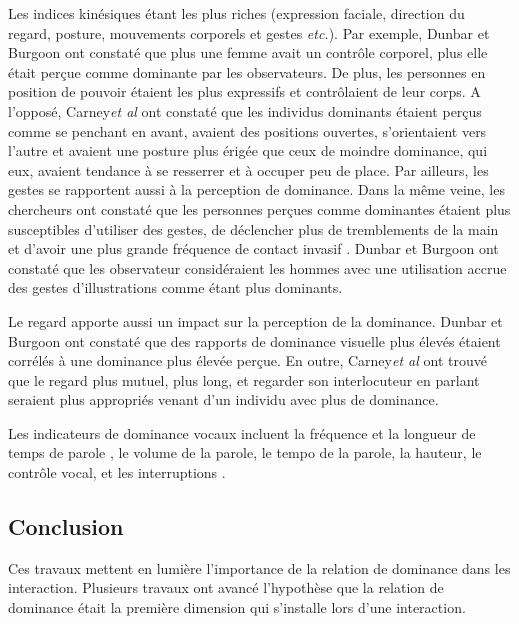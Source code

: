 			 Les indices kinésiques étant les plus riches (expression faciale, direction du regard, posture, mouvements corporels et gestes \emph{etc.}).
			Par exemple, Dunbar et Burgoon \cite{dunbar2005perceptions} ont constaté que plus une femme avait un contrôle corporel, plus elle était perçue comme dominante par les observateurs. De plus, les personnes en position de pouvoir  étaient les plus expressifs et  contrôlaient de leur corps.
			A l'opposé,  Carney\emph{et al}\cite{hall2005nonverbal} ont constaté que les individus dominants étaient perçus comme se penchant en avant, avaient des positions ouvertes, s'orientaient vers l'autre et avaient une posture plus érigée que ceux de moindre dominance, qui eux, avaient tendance à se resserrer et à occuper peu de place. Par ailleurs, les gestes se rapportent aussi à la perception de dominance.  
			Dans la même veine, les chercheurs ont constaté que les personnes perçues comme dominantes étaient plus susceptibles d'utiliser des gestes, de déclencher plus de tremblements de la main et d'avoir une plus grande fréquence de contact invasif \cite{hall2005nonverbal}.
			 Dunbar et Burgoon \cite{dunbar2005perceptions} ont constaté que les observateur considéraient les hommes avec une utilisation accrue des gestes d'illustrations comme étant plus dominants.
			
			Le regard apporte aussi un impact sur la perception de la dominance. Dunbar et Burgoon \cite{dunbar2005perceptions} ont constaté que des rapports de dominance visuelle plus élevés étaient corrélés à une dominance plus élevée perçue. En outre, Carney\emph{et al} \cite{hall2005nonverbal} ont trouvé que le regard plus mutuel, plus long, et regarder son interlocuteur en parlant seraient plus appropriés venant d'un individu avec plus de dominance.
			
			Les indicateurs de dominance vocaux incluent la fréquence et la longueur de temps de parole \cite{mast2002dominance}, le volume de la parole, le tempo de la parole, la hauteur, le contrôle vocal, et les interruptions \cite{dunbar2005perceptions}.
		
		\subsection{Conclusion}
			
			Ces travaux mettent en lumière l'importance de la relation de dominance dans les interaction. Plusieurs travaux ont avancé l'hypothèse que la relation de dominance était la première dimension qui s'installe lors d'une interaction. 
			
